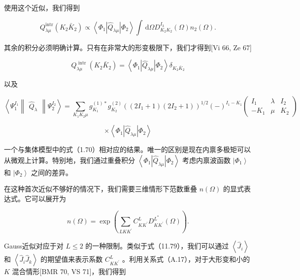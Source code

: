使用这个近似，我们得到

\[
{Q}^{\mathrm{{\mathrm{i}ntr}}}_{\lambda\mu}\left({{K}_{2}{\bar{K}}_{2}}\right)\propto\left\langle {{\Phi}_{1}\left|{\widehat{Q}}_{\lambda\mu}\right|{\Phi}_{2}}\right\rangle \int{\,\mathrm{d}\Omega}{D}^{{I}_{3}}_{{K}_{2}{K}_{2}}\left(\Omega\right){n}_{2}\left(\Omega\right).\tag{11.141}
\]

其余的积分必须明确计算。只有在非常大的形变极限下，我们才得到{[}Vi 66, Ze 67{]}

\[
{Q}^{\text{ intr }}_{\lambda\mu}\left({{K}_{2}{\bar{K}}_{2}}\right)=\left\langle {{\Phi}_{1}\left|{\widehat{Q}}_{\lambda\mu}\right|{\Phi}_{2}}\right\rangle {\delta}_{{K}_{2}{\bar{K}}_{2}}\tag{11.142}
\]

以及

\[
\left\langle {{\Psi}^{{I}_{1}}_{1}\begin{Vmatrix}{\widehat{Q}}_{\lambda}\end{Vmatrix}{\Psi}^{{I}_{2}}_{2}}\right\rangle =\mathop{\sum}\limits_{{{K}_{1}{K}_{2}\mu}}{g}^{\left(1\right)*}_{{K}_{1}}{g}^{\left(2\right)}_{{K}_{2}}{\left(\left(2{I}_{1}+1\right)\left(2{I}_{2}+1\right)\right)}^{1/2}{\left(-\right)}^{{I}_{1}-{K}_{1}}\left(\begin{matrix}{I}_{1} & \lambda & {I}_{2}\\
-{K}_{1} & \mu & {K}_{2}
\end{matrix}\right)
\]

\[
\times\left\langle {{\Phi}_{1}\left|{\widehat{Q}}_{\lambda\mu}\right|{\Phi}_{2}}\right\rangle \tag{11.143}
\]

一个与集体模型中的式（1.70）相对应的结果。唯一的区别是现在内禀多极矩可以从微观上计算。特别地，我们通过重叠积分 $\left\langle {{\Phi}_{1}\left|{\widehat{Q}}_{\lambda\mu}\right|{\Phi}_{2}}\right\rangle $
考虑内禀波函数 $\left|{\Phi}_{1}\right\rangle $ 和 $\left|{\Phi}_{2}\right\rangle $
之间的差异。

在这种首次近似不够好的情况下，我们需要三维情形下范数重叠 $n\left(\Omega\right)$ 的显式表达式。它可以展开为
\cite{IMR79}

\[
n\left(\Omega\right)=\exp\left({\mathop{\sum}\limits_{{{LK}{K}^{\prime}}}{C}^{L}_{K{K}^{\prime}}{D}^{{L}^{*}}_{K{K}^{\prime}}\left(\Omega\right)}\right).\tag{11.144}
\]

Gauss近似对应于对 $L\leq2$ 的一种限制。类似于式（11.79），我们可以通过 $\left\langle {\widehat{J}}_{i}\right\rangle $
和 $\left\langle {{\widehat{J}}_{i}{\widehat{J}}_{k}}\right\rangle $
的期望值来表示系数 ${C}^{L}_{K{K}^{\prime}}$ 。利用关系式（A.17），对于大形变和小的 $K$ 混合情形{[}BMR
70, VS 71{]}，我们得到

